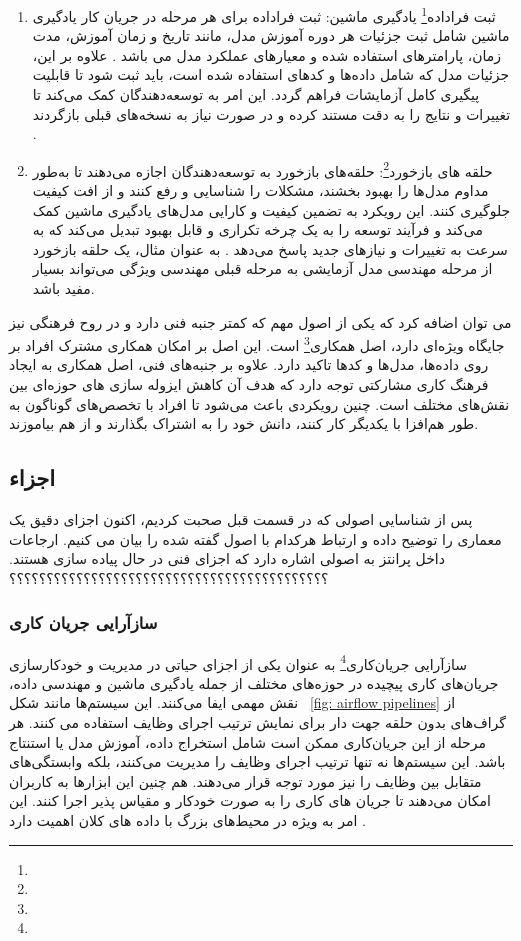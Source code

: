 \begin{enumerate}
	\item 
	 ثبت فراداده\footnote{} یادگیری ماشین:
ثبت فراداده برای هر مرحله در جریان ‌کار یادگیری ماشین شامل ثبت جزئیات هر دوره آموزش مدل، مانند تاریخ و زمان آموزش، مدت زمان، پارامترهای استفاده شده و معیارهای عملکرد مدل می باشد \cite{MLOpsWO2}. علاوه بر این، جزئیات مدل که شامل داده‌ها و کدهای استفاده شده است، باید ثبت شود تا قابلیت پیگیری کامل آزمایشات فراهم گردد. این امر به توسعه‌دهندگان کمک می‌کند تا تغییرات و نتایج را به دقت مستند کرده و در صورت نیاز به نسخه‌های قبلی بازگردند \cite{MLOpsProd2}.
	\item 
	حلقه های بازخورد\footnote{}:
حلقه‌های بازخورد به توسعه‌دهندگان اجازه می‌دهند تا به‌طور مداوم مدل‌ها را بهبود بخشند، مشکلات را شناسایی و رفع کنند و از افت کیفیت جلوگیری کنند. این رویکرد به تضمین کیفیت و کارایی مدل‌های یادگیری ماشین کمک می‌کند و فرآیند توسعه را به یک چرخه تکراری و قابل بهبود تبدیل می‌کند که به سرعت به تغییرات و نیازهای جدید پاسخ می‌دهد \cite{MLOpsProd2}. به عنوان مثال، یک حلقه بازخورد از مرحله مهندسی مدل آزمایشی به مرحله قبلی مهندسی ویژگی می‌تواند بسیار مفید باشد.
\end{enumerate}

می توان اضافه کرد که یکی از اصول مهم که کمتر جنبه فنی دارد و در روح فرهنگی  نیز جایگاه ویژه‌ای دارد، اصل همکاری\footnote{} است. این اصل بر امکان همکاری مشترک افراد بر روی داده‌ها، مدل‌ها و کدها تاکید دارد. علاوه بر جنبه‌های فنی، اصل همکاری به ایجاد فرهنگ کاری مشارکتی توجه دارد که هدف آن کاهش ایزوله سازی ‌های حوزه‌ای بین نقش‌های مختلف است. چنین رویکردی باعث می‌شود تا افراد با تخصص‌های گوناگون به طور هم‌افزا با یکدیگر کار کنند، دانش خود را به اشتراک بگذارند و از هم بیاموزند. 

\subsection{اجزاء}

پس از شناسایی اصولی که در قسمت قبل صحبت کردیم، اکنون اجزای دقیق یک معماری  را توضیح داده و ارتباط هرکدام با اصول گفته شده را بیان می کنیم. ارجاعات داخل پرانتز به اصولی اشاره دارد که اجزای فنی در حال پیاده سازی هستند. ؟؟؟؟؟؟؟؟؟؟؟؟؟؟؟؟؟؟؟؟؟؟؟؟؟؟؟؟؟؟؟؟؟؟؟؟؟؟؟؟؟؟؟

\subsubsection{سازآرایی جریان کاری}
سازآرایی جریان‌کاری\footnote{} به عنوان یکی از اجزای حیاتی در مدیریت و خودکارسازی جریان‌های کاری پیچیده در حوزه‌های مختلف از جمله یادگیری ماشین و مهندسی داده، نقش مهمی ایفا می‌کنند. این سیستم‌ها مانند شکل 
~\ref{fig: airflow pipelines}
از گراف‌های بدون حلقه جهت دار برای نمایش ترتیب اجرای وظایف استفاده می کنند. هر مرحله از این جریان‌کاری ممکن است شامل استخراج داده، آموزش مدل یا استنتاج باشد. این سیستم‌ها نه تنها ترتیب اجرای وظایف را مدیریت می‌کنند، بلکه وابستگی‌های متقابل بین وظایف را نیز مورد توجه قرار می‌دهند. هم چنین این ابزارها به کاربران امکان می‌دهند تا جریان های کاری را به صورت خودکار و مقیاس ‌پذیر اجرا کنند. این امر به ویژه در محیط‌های بزرگ با داده های کلان اهمیت دارد \cite{MLOpsWO2}.

